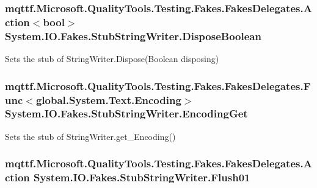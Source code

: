 \hypertarget{class_system_1_1_i_o_1_1_fakes_1_1_stub_string_writer_a725e75ba6d004b5d83b5cede1ec0a65a}{
\subsubsection[{Dispose\-Boolean}]{\setlength{\rightskip}{0pt plus 5cm}mqttf.\-Microsoft.\-Quality\-Tools.\-Testing.\-Fakes.\-Fakes\-Delegates.\-Action$<$bool$>$ System.\-I\-O.\-Fakes.\-Stub\-String\-Writer.\-Dispose\-Boolean}}\label{class_system_1_1_i_o_1_1_fakes_1_1_stub_string_writer_a725e75ba6d004b5d83b5cede1ec0a65a}


Sets the stub of String\-Writer.\-Dispose(\-Boolean disposing)

\hypertarget{class_system_1_1_i_o_1_1_fakes_1_1_stub_string_writer_af6bc1f8dd0a06cb1bb18bb0a2954bfe3}{
\subsubsection[{Encoding\-Get}]{\setlength{\rightskip}{0pt plus 5cm}mqttf.\-Microsoft.\-Quality\-Tools.\-Testing.\-Fakes.\-Fakes\-Delegates.\-Func$<$global.\-System.\-Text.\-Encoding$>$ System.\-I\-O.\-Fakes.\-Stub\-String\-Writer.\-Encoding\-Get}}\label{class_system_1_1_i_o_1_1_fakes_1_1_stub_string_writer_af6bc1f8dd0a06cb1bb18bb0a2954bfe3}


Sets the stub of String\-Writer.\-get\-\_\-\-Encoding()

\hypertarget{class_system_1_1_i_o_1_1_fakes_1_1_stub_string_writer_ad4edba51a5a35cbdb768a49d4ad7a645}{
\subsubsection[{Flush01}]{\setlength{\rightskip}{0pt plus 5cm}mqttf.\-Microsoft.\-Quality\-Tools.\-Testing.\-Fakes.\-Fakes\-Delegates.\-Action System.\-I\-O.\-Fakes.\-Stub\-String\-Writer.\-Flush01}}\label{class_system_1_1_i_o_1_1_fakes_1_1_stub_string_writer_ad4edba51a5a35cbdb768a49d4ad7a645}


